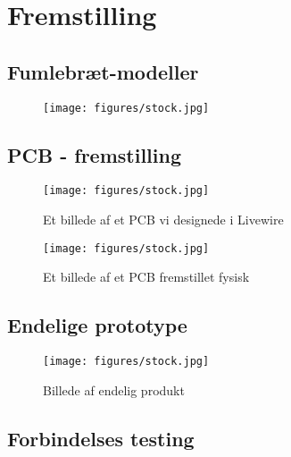 \section{Fremstilling}

\subsection{Fumlebræt-modeller}
	\begin{figure}[H]
		\centering
	    \texttt{[image: figures/stock.jpg]}
		\caption{}
		\label{fig:}
	\end{figure}
\subsection{PCB - fremstilling}\label{subs:pcbfremstilling}
	\begin{figure}[H]
		\centering
	    \texttt{[image: figures/stock.jpg]}
		\caption{Et billede af et PCB vi designede i Livewire}
		\label{fig:PCBPrint}
	\end{figure}
	\begin{figure}[H]
		\centering
	    \texttt{[image: figures/stock.jpg]}
		\caption{Et billede af et PCB fremstillet fysisk}
		\label{fig:PCBfysisk}
	\end{figure}
\subsection{Endelige prototype}\label{subs:endeligProto}
\begin{figure}[H]
	\centering
    \texttt{[image: figures/stock.jpg]}
	\caption{Billede af endelig produkt}
	\label{fig:endeligPrototype}
\end{figure}
\subsection{Forbindelses testing}


